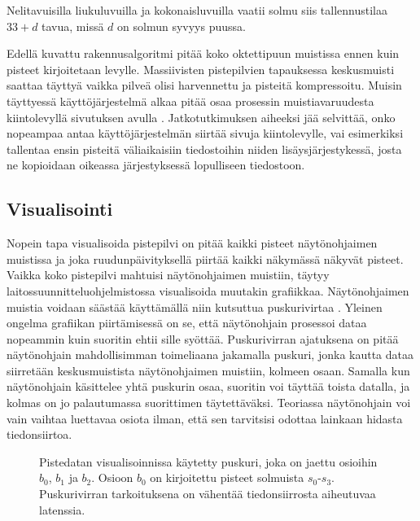 \noindent Nelitavuisilla liukuluvuilla ja kokonaisluvuilla vaatii solmu siis tallennustilaa $33 + d$ tavua, missä $d$ on solmun syvyys puussa.

Edellä kuvattu rakennusalgoritmi pitää koko oktettipuun muistissa ennen kuin pisteet kirjoitetaan levylle. Massiivisten pistepilvien tapauksessa keskusmuisti saattaa täyttyä vaikka pilveä olisi harvennettu ja pisteitä kompressoitu. Muisin täyttyessä käyttöjärjestelmä alkaa pitää osaa prosessin muistiavaruudesta kiintolevyllä sivutuksen  avulla \cite{os}. Jatkotutkimuksen aiheeksi jää selvittää, onko nopeampaa antaa käyttöjärjestelmän siirtää sivuja kiintolevylle, vai esimerkiksi tallentaa ensin pisteitä väliaikaisiin tiedostoihin niiden lisäysjärjestykessä, josta ne kopioidaan oikeassa järjestyksessä lopulliseen tiedostoon. 

\subsection{Visualisointi}\label{render}

Nopein tapa visualisoida pistepilvi on pitää kaikki pisteet näytönohjaimen muistissa ja joka ruudunpäivityksellä piirtää kaikki näkymässä näkyvät pisteet. Vaikka koko pistepilvi mahtuisi näytönohjaimen muistiin, täytyy laitossuunnitteluohjelmistossa visualisoida muutakin grafiikkaa. Näytönohjaimen muistia voidaan säästää käyttämällä niin kutsuttua puskurivirtaa . Yleinen ongelma grafiikan piirtämisessä on se, että näytönohjain prosessoi dataa nopeammin kuin suoritin ehtii sille syöttää. Puskurivirran ajatuksena on pitää näytönohjain mahdollisimman toimeliaana jakamalla puskuri, jonka kautta dataa siirretään keskusmuistista näytönohjaimen muistiin, kolmeen osaan. Samalla kun näytönohjain käsittelee yhtä puskurin osaa, suoritin voi täyttää toista datalla, ja kolmas on jo palautumassa suorittimen täytettäväksi. Teoriassa näytönohjain voi vain vaihtaa luettavaa osiota ilman, että sen tarvitsisi odottaa lainkaan hidasta tiedonsiirtoa. \cite{opengl}

\begin{figure}
    \centering
    
    \caption{Pistedatan visualisoinnissa käytetty puskuri, joka on jaettu osioihin $b_0$, $b_1$ ja $b_2$. Osioon $b_0$ on kirjoitettu pisteet solmuista $s_0$-$s_3$. Puskurivirran tarkoituksena on vähentää tiedonsiirrosta aiheutuvaa latenssia.}
    \label{triplebuffering}
\end{figure}

